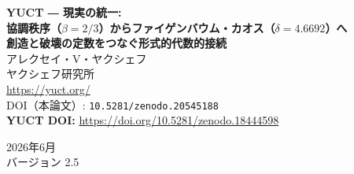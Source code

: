 \documentclass[11pt,a4paper]{article}
\begin{document}
	
	\begin{titlepage}
		\centering
		\vspace*{2cm}
		
		{\Huge\bfseries YUCT ― 現実の統一:\\[0.3cm]
			協調秩序（\(\beta = 2/3\)）からファイゲンバウム・カオス（\(\delta = 4.6692\)）へ}\\[1cm]
		
		{\Large\bfseries 創造と破壊の定数をつなぐ形式的代数的接続}\\[2cm]
		
		{\large アレクセイ・V・ヤクシェフ}\\[0.5cm]
		{\normalsize ヤクシェフ研究所}\\[0.3cm]
		{\normalsize \url{https://yuct.org/}}\\[1.5cm]
		
		{\normalsize DOI（本論文）: \texttt{10.5281/zenodo.20545188}}\\
		\vspace*{1cm}
		\textbf{YUCT DOI:} \url{https://doi.org/10.5281/zenodo.18444598}\\
		\vspace*{1cm}
		
		{\normalsize 2026年6月}\\[0.3cm]
		{\normalsize バージョン 2.5}\\[2cm]
	\end{titlepage}
	
\end{document}

